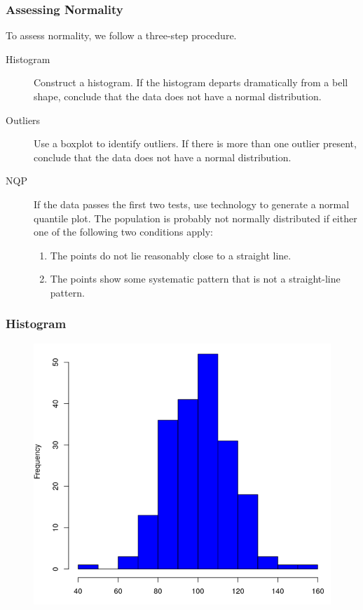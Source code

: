\documentclass[xcolor=dvipsnames]{beamer}
\begin{document}
\begin{frame}
  \frametitle{Assessing Normality}
To assess normality, we follow a three-step procedure.
\begin{description}
\item[Histogram] Construct a histogram. If the histogram departs
  dramatically from a bell shape, conclude that the data does not
  have a normal distribution.
\item[Outliers] Use a boxplot to identify outliers. If there is
  more than one outlier present, conclude that the data does not
  have a normal distribution.
\item[NQP] If the data passes the first two
  tests, use technology to generate a \alert{normal quantile
    plot}. The population is probably not normally distributed if
  either one of the following two conditions apply:
  \begin{enumerate}
  \item The points do not lie reasonably close to a straight line.
  \item The points show some systematic pattern that is not a
    straight-line pattern.
  \end{enumerate}
\end{description}
\end{frame}

\begin{frame}
  \frametitle{Histogram}
\begin{figure}[h]
\includegraphics[scale=.4]{./diagrams/an-hist.png}
\end{figure}
\end{frame}
\end{document}
